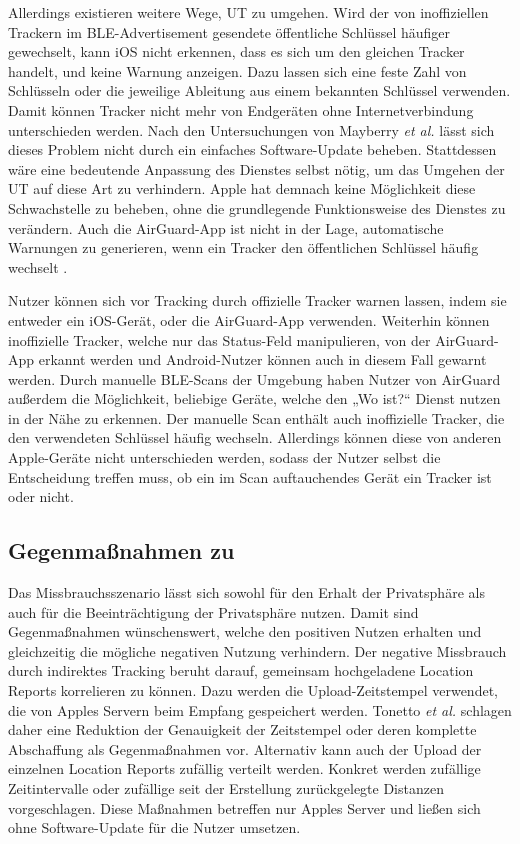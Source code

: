 Allerdings existieren weitere Wege, \ac{UT} zu umgehen.
Wird der von inoffiziellen Trackern im \ac{BLE}-Advertisement gesendete öffentliche Schlüssel häufiger gewechselt, kann iOS nicht erkennen, dass es sich um den gleichen Tracker handelt, und keine Warnung anzeigen.
Dazu lassen sich eine feste Zahl von Schlüsseln oder die jeweilige Ableitung aus einem bekannten Schlüssel verwenden.
Damit können Tracker nicht mehr von Endgeräten ohne Internetverbindung unterschieden werden.
Nach den Untersuchungen von Mayberry \textit{et al.} \cite{Mayberry_Tracking} lässt sich dieses Problem nicht durch ein einfaches Software-Update beheben.
Stattdessen wäre eine bedeutende Anpassung des Dienstes selbst nötig, um das Umgehen der \ac{UT} auf diese Art zu verhindern.
Apple hat demnach keine Möglichkeit diese Schwachstelle zu beheben, ohne die grundlegende Funktionsweise des Dienstes zu verändern.
Auch die AirGuard-App ist nicht in der Lage, automatische Warnungen zu generieren, wenn ein Tracker den öffentlichen Schlüssel häufig wechselt \cite{Heinrich_AirGuard}.

Nutzer können sich vor Tracking durch offizielle Tracker warnen lassen, indem sie entweder ein iOS-Gerät, oder die AirGuard-App verwenden.
Weiterhin können inoffizielle Tracker, welche nur das Status-Feld manipulieren, von der AirGuard-App erkannt werden und Android-Nutzer können auch in diesem Fall gewarnt werden.
Durch manuelle \ac{BLE}-Scans der Umgebung haben Nutzer von AirGuard außerdem die Möglichkeit, beliebige Geräte, welche den „Wo ist?“ Dienst nutzen in der Nähe zu erkennen.
Der manuelle Scan enthält auch inoffizielle Tracker, die den verwendeten Schlüssel häufig wechseln.
Allerdings können diese von anderen Apple-Geräte nicht unterschieden werden, sodass der Nutzer selbst die Entscheidung treffen muss, ob ein im Scan auftauchendes Gerät ein Tracker ist oder nicht.

\subsection{Gegenmaßnahmen zu }

Das Missbrauchsszenario  lässt sich sowohl für den Erhalt der Privatsphäre als auch für die Beeinträchtigung der Privatsphäre nutzen.
Damit sind Gegenmaßnahmen wünschenswert, welche den positiven Nutzen erhalten und gleichzeitig die mögliche negativen Nutzung verhindern.
Der negative Missbrauch durch indirektes Tracking beruht darauf, gemeinsam hochgeladene Location Reports korrelieren zu können.
Dazu werden die Upload-Zeitstempel verwendet, die von Apples Servern beim Empfang gespeichert werden.
Tonetto \textit{et al.} \cite{Tonetto_FindMy} schlagen daher eine Reduktion der Genauigkeit der Zeitstempel oder deren komplette Abschaffung als Gegenmaßnahmen vor.
Alternativ kann auch der Upload der einzelnen Location Reports zufällig verteilt werden.
Konkret werden zufällige Zeitintervalle oder zufällige seit der Erstellung zurückgelegte Distanzen vorgeschlagen.
Diese Maßnahmen betreffen nur Apples Server und ließen sich ohne Software-Update für die Nutzer umsetzen.

